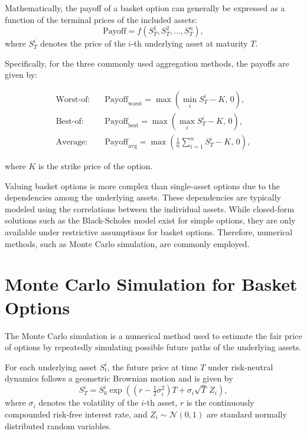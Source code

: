 Mathematically, the payoff of a basket option can generally be expressed as a function of the terminal prices of the included assets:
\begin{equation}
\text{Payoff} = f(S_T^{1}, S_T^{2}, \dots, S_T^{n}),
\end{equation}
where $S_T^{i}$ denotes the price of the $i$-th underlying asset at maturity $T$.

Specifically, for the three commonly used aggregation methods, the payoffs are given by:

\begin{align}
\text{Worst-of:} \quad & \text{Payoff}_{\text{worst}} = \max\!\left(\min_i S_T^{i} - K,\, 0\right),\\
\text{Best-of:} \quad & \text{Payoff}_{\text{best}} = \max\!\left(\max_i S_T^{i} - K,\, 0\right),\\
\text{Average:} \quad & \text{Payoff}_{\text{avg}} = \max\!\left(\frac{1}{n}\sum_{i=1}^{n} S_T^{i} - K,\, 0\right),
\end{align}

where $K$ is the strike price of the option.

Valuing basket options is more complex than single-asset options due to the dependencies among the underlying assets. These dependencies are typically modeled using the correlations between the individual assets. While closed-form solutions such as the Black-Scholes model \cite{black1973pricing} exist for simple options, they are only available under restrictive assumptions for basket options. Therefore, numerical methods, such as Monte Carlo simulation, are commonly employed.


\section{Monte Carlo Simulation for Basket Options}
\label{sec:bg-monte-carlo}
The Monte Carlo simulation \cite{boyle1977options} is a numerical method used to estimate the fair price of options by repeatedly simulating possible future paths of the underlying assets.

For each underlying asset $S_t^{i}$, the future price at time $T$ under
risk-neutral dynamics follows a geometric Brownian motion and is given by
\begin{equation}
S_T^{i}
=
S_0^{i}
\exp\!\left(
    (r - \tfrac{1}{2}\sigma_i^2) T
    +
    \sigma_i \sqrt{T}\, Z_i
\right),
\label{eq:bg-GBM}
\end{equation}
where $\sigma_i$ denotes the volatility of the $i$-th asset,
$r$ is the continuously compounded risk-free interest rate,
and $Z_i \sim \mathcal{N}(0,1)$ are standard normally distributed random variables.

